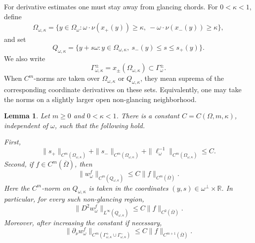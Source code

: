 \documentclass[11pt]{article}
\numberwithin{equation}{section}
\newtheorem{lemma}[theorem]{Lemma}
\newcommand{\R}{\mathbb R}
\newcommand{\Om}{\Omega}
\begin{document}
For derivative estimates one must stay away from glancing chords.  For \(0<\kappa<1\), define
\begin{equation}\label{eq:non-glancing-projected-set}
\begin{aligned}
    \Omega_{\omega,\kappa}
    =
    \{y\in\Omega_\omega:
       \omega\cdot\nu(x_+(y))\ge\kappa,
       \ -\omega\cdot\nu(x_-(y))\ge\kappa\},
\end{aligned}
\end{equation}
and set
\begin{equation}\label{eq:non-glancing-tube}
    Q_{\omega,\kappa}
    =
    \{y+s\omega:y\in\Omega_{\omega,\kappa},\ s_-(y)\le s\le s_+(y)\}.
\end{equation}
We also write
\[
    \Gamma_{\omega,\kappa}^\pm=x_\pm(\Omega_{\omega,\kappa})\subset \Gamma_\omega^\pm.
\]
When \(C^m\)-norms are taken over \(\Omega_{\omega,\kappa}\) or \(Q_{\omega,\kappa}\), they mean suprema of the corresponding coordinate derivatives on these sets.  Equivalently, one may take the norms on a slightly larger open non-glancing neighborhood.

\begin{lemma}\label{lem:non-glancing-regularity}
Let \(m\ge0\) and \(0<\kappa<1\).  There is a constant
\(C=C(\Omega,m,\kappa)\), independent of \(\omega\), such that the following hold.

First,
\begin{equation}\label{eq:s-pm-Cm-estimates}
    \|s_+\|_{C^m(\Omega_{\omega,\kappa})}
    +
    \|s_-\|_{C^m(\Omega_{\omega,\kappa})}
    +
    \|\ell_\omega^{-1}\|_{C^m(\Omega_{\omega,\kappa})}
    \le C .
\end{equation}
Second, if \(f\in C^m(\overline\Om)\), then
\begin{equation}\label{eq:w-Cm-nonglancing-estimate}
    \|w_\omega^f\|_{C^m(Q_{\omega,\kappa})}
    \le
    C\|f\|_{C^m(\overline\Om)} .
\end{equation}
Here the \(C^m\)-norm on \(Q_{\omega,\kappa}\) is taken in the coordinates \((y,s)\in\omega^\perp\times\R\).  In particular, for every such non-glancing region,
\begin{equation}\label{eq:w-C2-nonglancing-estimate}
    \|D^2 w_\omega^f\|_{L^\infty(Q_{\omega,\kappa})}
    \le
    C\|f\|_{C^2(\overline\Om)} .
\end{equation}
Moreover, after increasing the constant if necessary,
\begin{equation}\label{eq:normal-derivative-nonglancing-estimate}
    \|\partial_\nu w_\omega^f\|_{C^m(\Gamma_{\omega,\kappa}^+\cup\Gamma_{\omega,\kappa}^-)}
    \le
    C\|f\|_{C^{m+1}(\overline\Om)} .
\end{equation}
\end{lemma}
\end{document}
